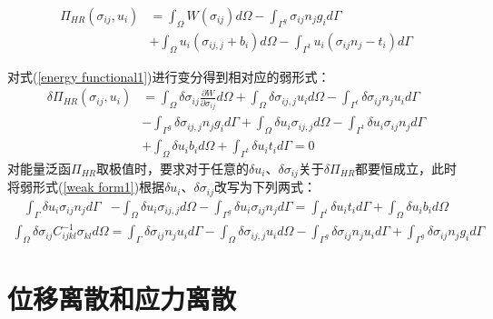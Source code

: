 \begin{equation}\label{energy functional1}
\begin{split}
    \Pi_{H\!R}(\sigma_{ij},u_i)&=\int_{\Omega}W(\sigma_{ij})d\Omega-\int_{\Gamma^g}\sigma_{ij}n_jg_id\Gamma\\
    &+\int_{\Omega}u_i(\sigma_{ij,j}+b_i)d\Omega-\int_{\Gamma^t}u_i(\sigma_{ij}n_j-t_i)d\Gamma
\end{split}
\end{equation}\par
对式(\ref{energy functional1})进行变分得到相对应的弱形式：
\begin{equation}\label{weak form1}
\begin{split} 
    \delta\Pi_{H\!R}(\sigma_{ij},u_i)&=\int_{\Omega}\delta\sigma_{ij}\frac{\partial W}{\partial \sigma_{ij}}d\Omega+\int_{\Omega}\delta\sigma_{ij,j}u_id\Omega-\int_{\Gamma^t}\delta\sigma_{ij}n_ju_id\Gamma\\
    &-\int_{\Gamma^g}\delta\sigma_{ij,j}n_jg_id\Gamma+\int_{\Omega}\delta u_i\sigma_{ij,j}d\Omega- \int_{\Gamma^t}\delta u_i\sigma_{ij}n_jd\Gamma\\
    &+\int_{\Omega}\delta u_ib_id\Omega+\int_{\Gamma^t}\delta u_it_id\Gamma=0
\end{split}
\end{equation}
对能量泛函$\Pi_{H\!R}$取极值时，要求对于任意的$\delta u_i$、$\delta\sigma_{ij}$关于$\delta\Pi_{H\!R}$都要恒成立，此时将弱形式(\ref{weak form1})根据$\delta u_i$、$\delta\sigma_{ij}$改写为下列两式：
\begin{equation}\label{deltau}
\begin{split}
    \int_{\Gamma}\delta u_i\sigma_{ij}n_jd\Gamma&-\int_{\Omega}\delta u_i\sigma_{ij,j}d\Omega-\int_{\Gamma^g}\delta u_i\sigma_{ij}n_jd\Gamma
    =\int_{\Gamma^t}\delta u_it_id\Gamma+\int_{\Omega}\delta u_ib_id\Omega
\end{split}
\end{equation} 
\begin{equation}\label{deltasigma}
\begin{split}
    \int_{\Omega}\delta\sigma_{ij}C^{-1}_{ijkl}\sigma_{kl}d\Omega=\int_{\Gamma}\delta\sigma_{ij}n_ju_id\Gamma-\int_{\Omega}\delta\sigma_{ij,j}u_id\Omega
    -\int_{\Gamma^g}\delta\sigma_{ij}n_ju_id\Gamma+\int_{\Gamma^g}\delta\sigma_{ij}n_jg_id\Gamma
\end{split}
\end{equation}    
\section{位移离散和应力离散}
